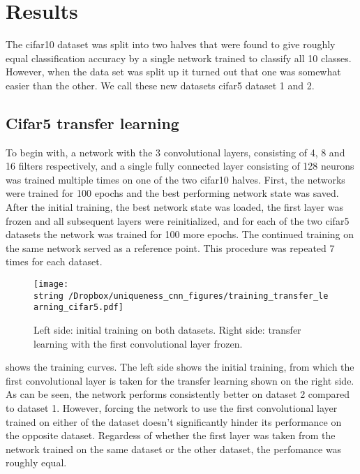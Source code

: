 \section{Results}

The cifar10 dataset was split into two halves that were found to give roughly equal classification accuracy by a single network trained to classify all 10 classes. However, when the data set was split up it turned out that one was somewhat easier than the other. We call these new datasets cifar5 dataset 1 and 2.

\subsection{Cifar5 transfer learning}

To begin with, a network with the 3 convolutional layers, consisting of 4, 8 and 16 filters respectively, and a single fully connected layer consisting of 128 neurons was trained multiple times on one of the two cifar10 halves. First, the networks were trained for 100 epochs and the best performing network state was saved. After the initial training, the best network state was loaded, the first layer was frozen and all subsequent layers were reinitialized, and for each of the two cifar5 datasets the network was trained for 100 more epochs. The continued training on the same network served as a reference point. This procedure was repeated 7 times for each dataset.

\begin{figure}[h!]
\begin{center}
  \texttt{[image: \\string~/Dropbox/uniqueness\_cnn\_figures/training\_transfer\_learning\_cifar5.pdf]}
\end{center}
\caption{Left side: initial training on both datasets. Right side: transfer learning with the first convolutional layer frozen.}
\label{fig:init_training_cifar5}
\end{figure}

 shows the training curves. The left side shows the initial training, from which the first convolutional layer is taken for the transfer learning shown on the right side. 
As can be seen, the network performs consistently better on dataset 2 compared to dataset 1. However, forcing the network to use the first convolutional layer trained on either of the dataset doesn't significantly hinder its performance on the opposite dataset. Regardess of whether the first layer was taken from the network trained on the same dataset or the other dataset, the perfomance was roughly equal.

